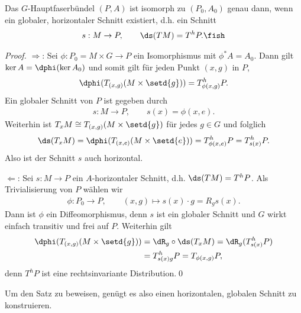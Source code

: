 \documentclass[%
	paper=a5,%
	fleqn,%
	DIV=18,%
	BCOR=0mm,
	fontsize=11pt,
	titlepage=false,%
	bibliography=totoc,
	DIV=18,%
	twoside=true,
	pdftitle=Riemannsche Geometrie,
	pdfauthor=Uwe Semmelmann,
	numbers=noendperiod]%
	{scrbook}
\begin{document}
\begin{lem}
Das $G$-Hauptfaserbündel $(P,A)$ ist isomorph zu $(P_0,A_0)$ genau dann, wenn
ein globaler, horizontaler Schnitt existiert, d.h. ein Schnitt
\begin{align*}
s: M\to P,\qquad \ds(TM) = T^hP.\fish
\end{align*}
\end{lem}
\begin{proof}
$\Rightarrow$: Sei $\phi: P_0=M\times G\to P$ ein Isomorphismus mit $\phi^* A =
A_0$. Dann gilt $\ker A = \dphi(\ker A_0)$ und somit gilt für jeden Punkt
$(x,g)$ in $P$,
\begin{align*}
\dphi(T_{(x,g)} (M\times \setd{g})) = T^h_{\phi(x,g)}P.
\end{align*}
Ein globaler Schnitt von $P$ ist gegeben durch
\begin{align*}
s: M\to P,\qquad s(x) = \phi(x,e).
\end{align*}
Weiterhin ist $T_xM \cong T_{(x,g)} (M\times \setd{g})$ für jedes $g\in G$ und
folglich
\begin{align*}
\ds(T_xM) = \dphi(T_{(x,e)} (M\times \setd{e})) = T^h_{\phi(x,e)}P =
T^h_{s(x)}P.
\end{align*}
Also ist der Schnitt $s$ auch horizontal.

$\Leftarrow$: Sei $s: M\to P$ ein $A$-horizontaler Schnitt, d.h. $\ds(TM) =
T^hP$. Als Trivialisierung von $P$ wählen wir
\begin{align*}
\phi: P_0\to P,\qquad (x,g) \mapsto s(x)\cdot g = R_g s(x).
\end{align*}
Dann ist $\phi$ ein Diffeomorphismus, denn $s$ ist ein globaler Schnitt und $G$
wirkt einfach transitiv und frei auf $P$. Weiterhin gilt
\begin{align*}
\dphi(T_{(x,g)}(M\times \setd{g})) &= \dR_g\circ \ds(T_xM) = 
\dR_g(T_{s(x)}^hP) \\ &= T_{s(x)g}^hP = T_{\phi(x,g)}P,
\end{align*}
denn $T^hP$ ist eine rechtsinvariante Distribution.\qed
\end{proof}

Um den Satz zu beweisen, genügt es also einen horizontalen, globalen Schnitt zu
konstruieren.
\end{document}
